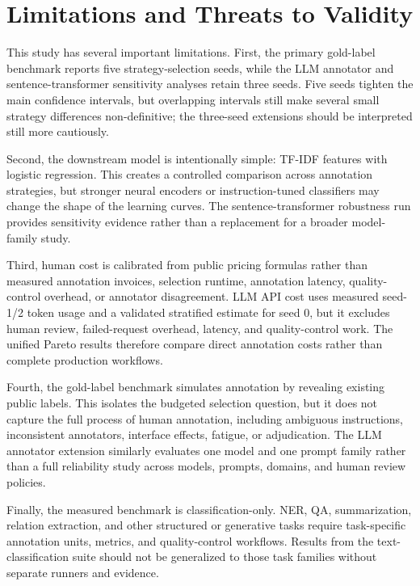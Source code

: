 \documentclass[11pt]{article}
\begin{document}
\FloatBarrier

\section{Limitations and Threats to Validity}

This study has several important limitations. First, the primary gold-label benchmark reports five strategy-selection seeds, while the LLM annotator and sentence-transformer sensitivity analyses retain three seeds. Five seeds tighten the main confidence intervals, but overlapping intervals still make several small strategy differences non-definitive; the three-seed extensions should be interpreted still more cautiously.

Second, the downstream model is intentionally simple: TF-IDF features with logistic regression. This creates a controlled comparison across annotation strategies, but stronger neural encoders or instruction-tuned classifiers may change the shape of the learning curves. The sentence-transformer robustness run provides sensitivity evidence rather than a replacement for a broader model-family study.

Third, human cost is calibrated from public pricing formulas rather than measured annotation invoices, selection runtime, annotation latency, quality-control overhead, or annotator disagreement. LLM API cost uses measured seed-1/2 token usage and a validated stratified estimate for seed 0, but it excludes human review, failed-request overhead, latency, and quality-control work. The unified Pareto results therefore compare direct annotation costs rather than complete production workflows.

Fourth, the gold-label benchmark simulates annotation by revealing existing public labels. This isolates the budgeted selection question, but it does not capture the full process of human annotation, including ambiguous instructions, inconsistent annotators, interface effects, fatigue, or adjudication. The LLM annotator extension similarly evaluates one model and one prompt family rather than a full reliability study across models, prompts, domains, and human review policies.

Finally, the measured benchmark is classification-only. NER, QA, summarization, relation extraction, and other structured or generative tasks require task-specific annotation units, metrics, and quality-control workflows. Results from the text-classification suite should not be generalized to those task families without separate runners and evidence.
\end{document}
